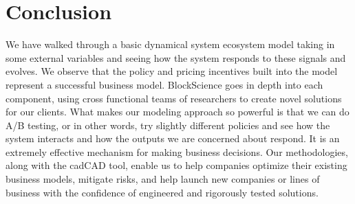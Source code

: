 \documentclass[12pt]{extarticle}
\begin{document}
\section{Conclusion}
We have walked through a basic dynamical system ecosystem model taking in some external variables and seeing how the system responds to these signals and evolves. We observe that the policy and pricing incentives built into the model represent a successful business model. BlockScience goes in depth into each component, using cross functional teams of researchers to create novel solutions for our clients. What makes our modeling approach so powerful is that we can do A/B testing, or in other words, try slightly different policies and see how the system interacts and how the outputs we are concerned about respond. It is an extremely effective mechanism for making business decisions. Our methodologies, along with the cadCAD tool, enable us to help companies optimize their existing business models, mitigate risks, and help launch new companies or lines of business with the confidence of engineered and rigorously tested solutions.
\end{document}
